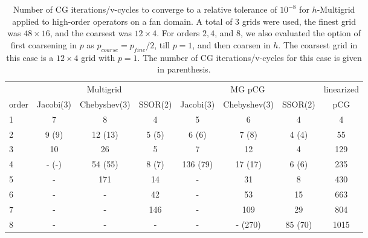 \begin{table}
  \caption{\label{tab:fan} Number of CG iterations/v-cycles to converge to a relative tolerance of $10^{-8}$ for $h$-Multigrid applied to high-order operators on a fan domain. A total of 3 grids were used, the finest grid was $48\times 16$, and the coarsest was $12\times 4$. For orders $2,4$, and $8$, we also evaluated the option of first coarsening in $p$ as $p_{coarse} = p_{fine}/2$, till $p=1$, and then coarsen in $h$. The coarsest grid in this case is a $12\times 4$ grid with $p=1$. The number of CG iterations/v-cycles for this case is given in parenthesis.}
		\centering
    \begin{tabular}{|l|c|c|c|c|c|c|c|} 
\hline
                     & \multicolumn{3}{c|}{Multigrid} & \multicolumn{3}{c|}{MG pCG} &          linearized    \\
\cline{2-7}
			order &          \scriptsize Jacobi(3) &   \scriptsize  Chebyshev(3) & \scriptsize SSOR(2) & \scriptsize Jacobi(3) & \scriptsize  Chebyshev(3) & \scriptsize SSOR(2) & pCG\\
\hline
                   1 &                              7 &                           8 &                   4 &                     5 &                         6 &                   4 &  4  \\
                   2 &                          9 (9) &                     12 (13) &               5 (5) &                 6 (6) &                     7 (8) &               4 (4) &  55  \\
                   3 &                             10 &                          26 &                   5 &                     7 &                        12 &                   4 &  129  \\
                   4 &                          - (-) &                     54 (55) &               8 (7) &              136 (79) &                   17 (17) &               6 (6) &  235  \\
                   5 &                              - &                         171 &                  14 &                     - &                        31 &                   8 &  430  \\
                   6 &                              - &                           - &                  42 &                     - &                        53 &                  15 &  663  \\
                   7 &                              - &                           - &                 146 &                     - &                       109 &                  29 &  804  \\
                   8 &                              - &                           - &                   - &                     - &                   - (270) &             85 (70) &  1015  \\
\hline
	  \end{tabular}
\end{table}


